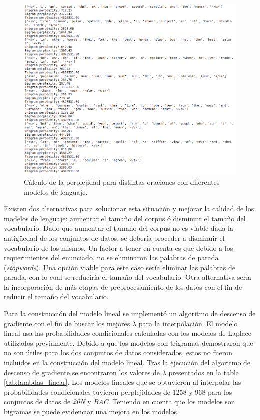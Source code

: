 \begin{figure}[h]
    \centering
    \includegraphics[width=\textwidth]{doc/images/perplexity.png}
    \caption{Cálculo de la perplejidad para distintas oraciones con diferentes modelos de lenguaje.}
    \label{fig:perplexity_sentences}
\end{figure}

Existen dos alternativas para solucionar esta situación y mejorar la calidad de los modelos de lenguaje: aumentar el tamaño del corpus ó disminuir el tamaño del vocabulario. Dado que aumentar el tamaño del corpus no es viable dada la antigüedad de los conjuntos de datos, se debería proceder a disminuir el vocabulario de los mismos. Un factor a tener en cuenta es que debido a los requerimientos del enunciado, no se eliminaron las palabras de parada (\textit{stopwords}). Una opción viable para este caso sería eliminar las palabras de parada, con lo cual se reduciría el tamaño del vocabulario. Otra alternativa sería la incorporación de más etapas de preprocesamiento de los datos con el fin de reducir el tamaño del vocabulario.

Para la construcción del modelo lineal se implementó un algoritmo de descenso de gradiente con el fin de buscar los mejores $\lambda$ para la interpolación. El modelo lineal usa las probabilidades condicionales calculadas con los modelos de Laplace utilizados previamente. Debido a que los modelos con trigramas demostraron que no son útiles para los dos conjuntos de datos considerados, estos no fueron incluidos en la construcción del modelo lineal. Tras la ejecución del algoritmo de descenso de gradiente se encontraron los valores de $\lambda$ presentados en la tabla \ref{tab:lambdas_linear}. Los modelos lineales que se obtuvieron al interpolar las probabilidades condicionales tuvieron perplejidades de 1258 y 968 para los conjuntos de datos de \textit{20N} y \textit{BAC}. Teniendo en cuenta que los modelos son bigramas se puede evidenciar una mejora en los modelos. 

